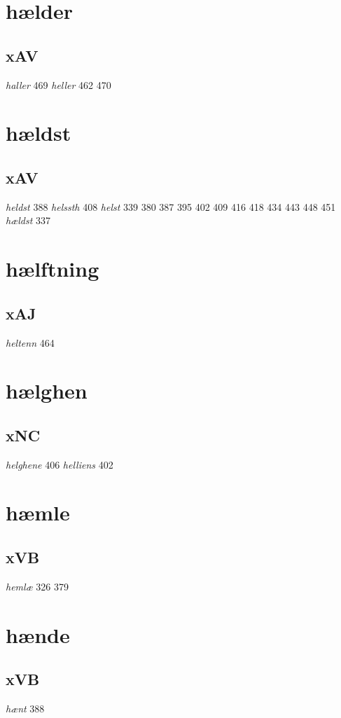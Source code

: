 \documentclass[a4paper,twocolumn]{article}
\begin{document}
\section{hælder}
\label{sec:org8ad52a8}
\subsection{xAV}
\label{sec:org93ffaf9}
\emph{haller} 469 \emph{heller} 462 470 
\section{hældst}
\label{sec:org2c29579}
\subsection{xAV}
\label{sec:org1e1948f}
\emph{heldst} 388 \emph{helssth} 408 \emph{helst} 339 380 387 395 402 409 416 418 434 443 448 451 \emph{hældst} 337 
\section{hælftning}
\label{sec:orgde58695}
\subsection{xAJ}
\label{sec:org32867f2}
\emph{heltenn} 464 
\section{hælghen}
\label{sec:orgd4e2091}
\subsection{xNC}
\label{sec:org579a12c}
\emph{helghene} 406 \emph{helliens} 402 
\section{hæmle}
\label{sec:org73f71cd}
\subsection{xVB}
\label{sec:orga643d1b}
\emph{hemlæ} 326 379 
\section{hænde}
\label{sec:orge3011ea}
\subsection{xVB}
\label{sec:org465bdae}
\emph{hænt} 388 
\end{document}
